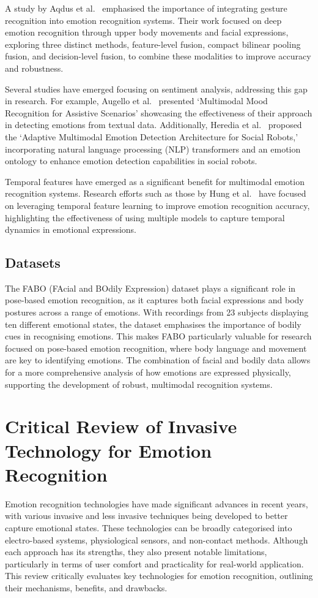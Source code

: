 A study by Aqdus et al.\ \cite{Aqdus2021-xr} emphasised the importance of integrating gesture recognition into emotion recognition systems. Their work focused on deep emotion recognition through upper body movements and facial expressions, exploring three distinct methods, feature-level fusion, compact bilinear pooling fusion, and decision-level fusion, to combine these modalities to improve accuracy and robustness.

Several studies have emerged focusing on sentiment analysis, addressing this gap in research. For example, Augello et al.\ \cite{Augello2022-zy} presented `Multimodal Mood Recognition for Assistive Scenarios' showcasing the effectiveness of their approach in detecting emotions from textual data. Additionally, Heredia et al.\ \cite{Heredia2022-dt} proposed the `Adaptive Multimodal Emotion Detection Architecture for Social Robots,' incorporating natural language processing (NLP) transformers and an emotion ontology to enhance emotion detection capabilities in social robots.

Temporal features have emerged as a significant benefit for multimodal emotion recognition systems. Research efforts such as those by Hung et al.\ \cite{Hung2020-gm} have focused on leveraging temporal feature learning to improve emotion recognition accuracy, highlighting the effectiveness of using multiple models to capture temporal dynamics in emotional expressions.

\subsection{Datasets}

The FABO (FAcial and BOdily Expression) dataset \cite{1699093} plays a significant role in pose-based emotion recognition, as it captures both facial expressions and body postures across a range of emotions. With recordings from 23 subjects displaying ten different emotional states, the dataset emphasises the importance of bodily cues in recognising emotions. This makes FABO particularly valuable for research focused on pose-based emotion recognition, where body language and movement are key to identifying emotions. The combination of facial and bodily data allows for a more comprehensive analysis of how emotions are expressed physically, supporting the development of robust, multimodal recognition systems.

\section{Critical Review of Invasive Technology for Emotion Recognition}
Emotion recognition technologies have made significant advances in recent years, with various invasive and less invasive techniques being developed to better capture emotional states. These technologies can be broadly categorised into electro-based systems, physiological sensors, and non-contact methods. Although each approach has its strengths, they also present notable limitations, particularly in terms of user comfort and practicality for real-world application. This review critically evaluates key technologies for emotion recognition, outlining their mechanisms, benefits, and drawbacks.

